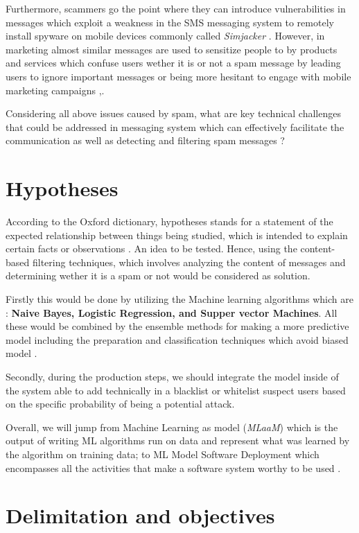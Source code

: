 \documentclass[12pt,a4paper]{report}
\begin{document}
	Furthermore, scammers go the point where they can introduce vulnerabilities in messages which exploit a weakness in the SMS messaging system to remotely install spyware on mobile devices commonly called \textit{Simjacker}  \cite{cimpanu2019simjacker}. However, in marketing  almost similar messages are used to sensitize people to by products and services which confuse users wether it is or not a spam message by leading users to ignore important messages or being more hesitant to engage with mobile marketing campaigns \cite{chen2017survey},\cite{leppaniemi2008mobile}.
	
	Considering all above issues caused by spam, what are key technical challenges that could be addressed in messaging system which can effectively facilitate the communication as well as detecting and filtering spam messages ? 
	
	\section{Hypotheses}  
	 According to the Oxford dictionary, hypotheses stands for a statement of the expected relationship between things being studied, which is intended to explain certain facts or observations \cite{park2012dictionary}. An idea to be tested.
	 Hence, using the content-based filtering techniques, which involves analyzing the content of messages and determining wether it is a spam or not would be considered as solution. 
	
	 Firstly this would be done by utilizing the Machine learning algorithms which are : \textbf{Naive Bayes, Logistic Regression, and Supper vector Machines}. All these would be combined by the ensemble methods for making a more predictive model \cite{raschka2017python} including the preparation and classification techniques which avoid biased model \cite{karl1986model}. 
	 
	 Secondly, during the production steps, we should integrate the model inside of the system able to add technically in a blacklist or whitelist suspect users based on the specific probability of being a potential attack.
	 
	 Overall, we will jump from Machine Learning as model (\textit{MLaaM}) which is the output of writing ML algorithms run on data and represent what was learned by the algorithm on training data; to ML Model Software Deployment which encompasses all the activities that make a software system worthy to be used \cite{hadullo2021machine}.
	 
	\section{Delimitation and objectives}  
\end{document}
